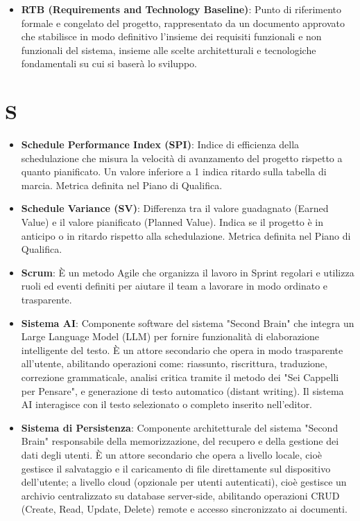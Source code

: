 \documentclass[11pt,a4paper]{article}
\begin{document}
\begin{itemize}
\item \textbf{RTB (Requirements and Technology Baseline)}: Punto di riferimento formale e congelato del progetto, rappresentato da un documento approvato che stabilisce in modo definitivo l’insieme dei requisiti funzionali e non funzionali del sistema, insieme alle scelte architetturali e tecnologiche fondamentali su cui si baserà lo sviluppo. 
\end{itemize}
\newpage

\section*{S}
\begin{itemize}
\item \textbf{Schedule Performance Index (SPI)}: Indice di efficienza della schedulazione che misura la velocità di avanzamento del progetto rispetto a quanto pianificato. Un valore inferiore a 1 indica ritardo sulla tabella di marcia. Metrica definita nel Piano di Qualifica.

\item \textbf{Schedule Variance (SV)}: Differenza tra il valore guadagnato (Earned Value) e il valore pianificato (Planned Value). Indica se il progetto è in anticipo o in ritardo rispetto alla schedulazione. Metrica definita nel Piano di Qualifica.

\item \textbf{Scrum}: È un metodo Agile che organizza il lavoro in Sprint regolari e utilizza ruoli ed eventi definiti per aiutare il team a lavorare in modo ordinato e trasparente.

\item \textbf{Sistema AI}: Componente software del sistema "Second Brain" che integra un Large Language Model (LLM) per fornire funzionalità di elaborazione intelligente del testo. È un attore secondario che opera in modo trasparente all'utente, abilitando operazioni come: riassunto, riscrittura, traduzione, correzione grammaticale, analisi critica tramite il metodo dei "Sei Cappelli per Pensare", e generazione di testo automatico (distant writing). Il sistema AI interagisce con il testo selezionato o completo inserito nell'editor.

\item \textbf{Sistema di Persistenza}: Componente architetturale del sistema "Second Brain" responsabile della memorizzazione, del recupero e della gestione dei dati degli utenti. È un attore secondario che opera a livello locale, cioè gestisce il salvataggio e il caricamento di file direttamente sul dispositivo dell'utente; a livello cloud (opzionale per utenti autenticati), cioè gestisce un archivio centralizzato su database server-side, abilitando operazioni CRUD (Create, Read, Update, Delete) remote e accesso sincronizzato ai documenti.


\end{itemize}
\end{document}
